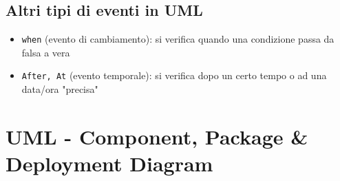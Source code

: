 \documentclass[12pt, a4paper]{report}
\begin{document}
\section{Altri tipi di eventi in UML}
\begin{itemize}
    \item \texttt{when} (evento di cambiamento): si verifica quando una condizione passa da falsa a vera
    \item \texttt{After, At} (evento temporale): si verifica dopo un certo tempo o ad una data/ora "precisa"
\end{itemize}
\chapter{UML - Component, Package \& Deployment Diagram}
\end{document}

